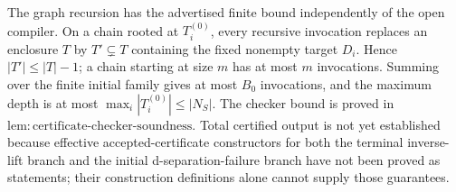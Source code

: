 The graph recursion has the advertised finite bound independently of the open compiler.  On a chain rooted at \(T_i^{(0)}\), every recursive invocation replaces an enclosure \(T\) by \(T'\subsetneq T\) containing the fixed nonempty target \(D_i\).  Hence \(|T'|\le |T|-1\); a chain starting at size \(m\) has at most \(m\) invocations.  Summing over the finite initial family gives at most \(B_0\) invocations, and the maximum depth is at most \(\max_i|T_i^{(0)}|\le|N_S|\).  The checker bound is proved in \(\mathrm{lem:certificate\text{-}checker\text{-}soundness}\).  Total certified output is not yet established because effective accepted-certificate constructors for both the terminal inverse-lift branch and the initial d-separation-failure branch have not been proved as statements; their construction definitions alone cannot supply those guarantees.
